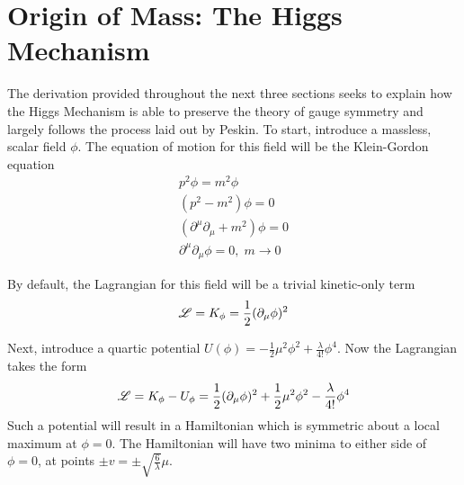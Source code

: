 \section{Origin of Mass: The Higgs Mechanism}\label{sec:higgs_mechanism}

    The derivation provided throughout the next three sections seeks to explain
        how the Higgs Mechanism is able to preserve the theory of gauge symmetry
        and largely follows the process laid out by Peskin\cite{Peskin_book}.
    To start, introduce a massless, scalar field $\phi$.
    The equation of motion for this field will be the Klein-Gordon equation
    \begin{equation} \begin{split}
        p^2 \phi = m^2 \phi
        \\(p^2 - m^2) \phi = 0
        \\(\partial^\mu \partial_\mu + m^2) \phi = 0
        \\\partial^\mu \partial_\mu \phi = 0,\; m\to0
    \end{split} \end{equation}

    By default, the Lagrangian for this field will be a trivial kinetic-only term
    \begin{equation}
        \mathscr{L} = K_{\phi} = \frac{1}{2} (\partial_{\mu} \phi)^2
    \end{equation}
    
    Next, introduce a quartic potential $U(\phi) = -\frac{1}{2} \mu^2 \phi^2 + \frac{\lambda}{4!} \phi^4$.
    Now the Lagrangian takes the form
    \begin{equation}
        \mathscr{L} = K_{\phi} - U_{\phi} = \frac{1}{2} (\partial_{\mu} \phi)^2 
            +\frac{1}{2} \mu^2 \phi^2 - \frac{\lambda}{4!} \phi^4
    \end{equation}
    Such a potential will result in a Hamiltonian which is symmetric about a local maximum at $\phi=0$.
    The Hamiltonian will have two minima to either side of $\phi=0$, at points $\pm v = \pm \sqrt{\frac{6}{\lambda}} \mu$.


